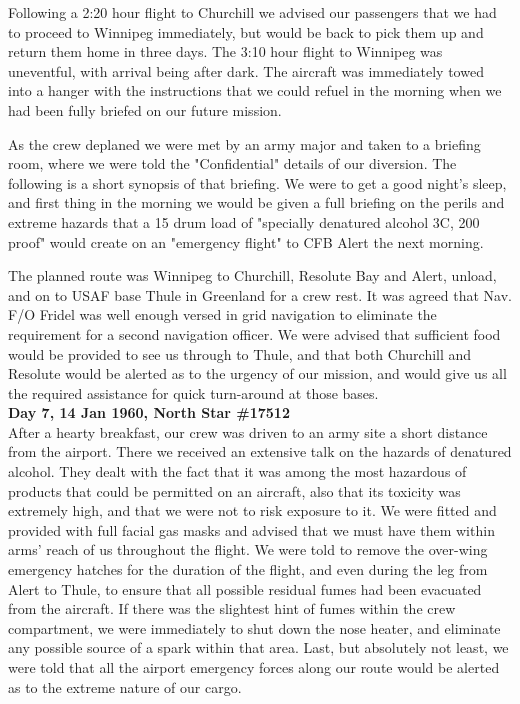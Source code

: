 Following a 2:20 hour flight to Churchill we advised our passengers
that we had to proceed to Winnipeg immediately, but would be back to
pick them up and return them home in three days. The 3:10 hour flight
to Winnipeg was uneventful, with arrival being after dark. The aircraft
was immediately towed into a hanger with the instructions that we could
refuel in the morning when we had been fully briefed on our future
mission.

As the crew deplaned we were met by an army major and taken to a
briefing room, where we were told the "Confidential" details of our
diversion. The following is a short synopsis of that briefing. We were
to get a good night's sleep, and first thing in the morning we would be
given a full briefing on the perils and extreme hazards that a 15 drum
load of "specially denatured alcohol 3C, 200 proof" would create on an
"emergency flight" to CFB Alert the next morning.

The planned route was Winnipeg to Churchill, Resolute Bay and Alert,
unload, and on to USAF base Thule in Greenland for a crew rest. It was
agreed that Nav. F/O Fridel was well enough versed in grid navigation
to eliminate the requirement for a second navigation officer.  We were
advised that sufficient food would be provided to see us through to
Thule, and that both Churchill and Resolute would be alerted as to the
urgency of our mission, and would give us all the required assistance
for quick turn-around at those bases.\\

\noindent\textbf{Day 7, 14 Jan 1960, North Star \#17512}\\

After a hearty breakfast, our crew was driven to an army site a short
distance from the airport. There we received an extensive talk on the
hazards of denatured alcohol. They dealt with the fact that it was
among the most hazardous of products that could be permitted on an
aircraft, also that its toxicity was extremely high, and that we were
not to risk exposure to it. We were fitted and provided with full
facial gas masks and advised that we must have them within arms' reach
of us throughout the flight. We were told to remove the over-wing
emergency hatches for the duration of the flight, and even during the
leg from Alert to Thule, to ensure that all possible residual fumes had
been evacuated from the aircraft. If there was the slightest hint of
fumes within the crew compartment, we were immediately to shut down the
nose heater, and eliminate any possible source of a spark within that
area. Last, but absolutely not least, we were told that all the airport
emergency forces along our route would be alerted as to the extreme
nature of our cargo.

